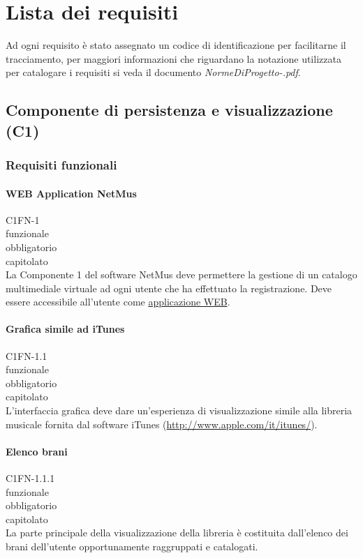 \chapter{Lista dei requisiti}
\thispagestyle{fancy}
Ad ogni requisito \`e stato assegnato un codice di identificazione per facilitarne
il tracciamento, per maggiori informazioni che riguardano la notazione
utilizzata per catalogare i requisiti si veda il documento
\emph{NormeDiProgetto-\versionenormeprogetto.pdf}.

\section{Componente di persistenza e visualizzazione (C1)}
\subsection{Requisiti funzionali}

\subsubsection*{WEB Application NetMus}
 C1FN-1 \\
 funzionale \\
 obbligatorio \\
 capitolato\\
La Componente 1 del software NetMus deve permettere la gestione di un catalogo
multimediale virtuale ad ogni utente che ha effettuato la registrazione.
Deve essere accessibile all'utente come \underline{applicazione WEB}.

\subsubsection*{Grafica simile ad iTunes}
 C1FN-1.1 \\
 funzionale \\
 obbligatorio \\
 capitolato \\
L'interfaccia grafica deve dare un'esperienza di visualizzazione simile alla
libreria musicale fornita dal software iTunes (\url{http://www.apple.com/it/itunes/}).

\subsubsection*{Elenco brani}
 C1FN-1.1.1 \\
 funzionale \\
 obbligatorio \\
 capitolato \\
La parte principale della visualizzazione della libreria \`e costituita
dall'elenco dei brani dell'utente opportunamente raggruppati e catalogati.

